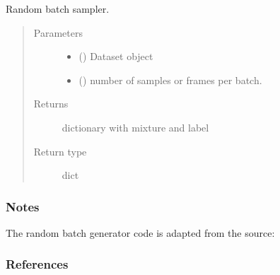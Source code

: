 \documentclass[letterpaper,10pt,english,openany,oneside]{sphinxmanual}
\begin{document}
\begin{fulllineitems}
\label{\detokenize{docs/source/train:train.train_model.random_batch_sampler}}
Random batch sampler.
\begin{quote}\begin{description}
\item[{Parameters}] \leavevmode\begin{itemize}
\item {} 
 ({\hyperref[\detokenize{docs/source/dataset:dataset.Dataset}]{}}) \textendash{} Dataset object

\item {} 
 () \textendash{} number of samples or frames per batch.

\end{itemize}

\item[{Returns}] \leavevmode
dictionary with mixture and label

\item[{Return type}] \leavevmode
dict

\end{description}\end{quote}
\subsubsection*{Notes}

The random batch generator code is adapted from the source:
\subsubsection*{References}

\end{fulllineitems}

\end{document}
